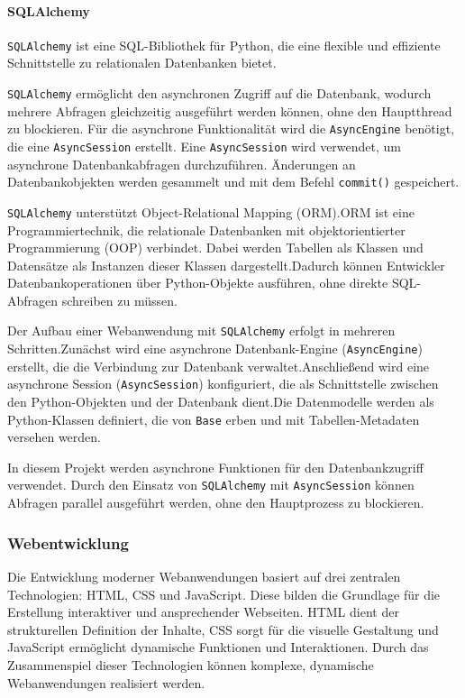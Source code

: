 \documentclass[12pt, letterpaper]{article}
\begin{document}
  \paragraph{SQLAlchemy}
  \par \textbf{}
  \par \texttt{SQLAlchemy} \cite{sqlalchemy} ist eine SQL-Bibliothek für Python, die eine flexible und effiziente Schnittstelle zu relationalen Datenbanken bietet.
  \par \texttt{SQLAlchemy} ermöglicht den asynchronen Zugriff auf die Datenbank, wodurch mehrere Abfragen gleichzeitig ausgeführt werden können, ohne den Hauptthread zu blockieren. Für die asynchrone Funktionalität wird die \texttt{AsyncEngine} benötigt, die eine \texttt{AsyncSession} erstellt. Eine \texttt{AsyncSession} wird verwendet, um asynchrone Datenbankabfragen durchzuführen. Änderungen an Datenbankobjekten werden gesammelt und mit dem Befehl \texttt{commit()} gespeichert.
  \par \texttt{SQLAlchemy} unterstützt Object-Relational Mapping (ORM).ORM ist eine Programmiertechnik, die relationale Datenbanken mit objektorientierter Programmierung (OOP) verbindet. Dabei werden Tabellen als Klassen und Datensätze als Instanzen dieser Klassen dargestellt.Dadurch können Entwickler Datenbankoperationen über Python-Objekte ausführen, ohne direkte SQL-Abfragen schreiben zu müssen.
  \par Der Aufbau einer Webanwendung mit \texttt{SQLAlchemy} erfolgt in mehreren Schritten.Zunächst wird eine asynchrone Datenbank-Engine (\texttt{AsyncEngine}) erstellt, die die Verbindung zur Datenbank verwaltet.Anschließend wird eine asynchrone Session (\texttt{AsyncSession}) konfiguriert, die als Schnittstelle zwischen den Python-Objekten und der Datenbank dient.Die Datenmodelle werden als Python-Klassen definiert, die von \texttt{Base} erben und mit Tabellen-Metadaten versehen werden.
  \par In diesem Projekt werden asynchrone Funktionen für den Datenbankzugriff verwendet. Durch den Einsatz von \texttt{SQLAlchemy} mit \texttt{AsyncSession} können Abfragen parallel ausgeführt werden, ohne den Hauptprozess zu blockieren.

  \subsubsection{Webentwicklung}
  \par Die Entwicklung moderner Webanwendungen basiert auf drei zentralen Technologien: HTML, CSS und JavaScript. Diese bilden die Grundlage für die Erstellung interaktiver und ansprechender Webseiten. HTML dient der strukturellen Definition der Inhalte, CSS sorgt für die visuelle Gestaltung und JavaScript ermöglicht dynamische Funktionen und Interaktionen. Durch das Zusammenspiel dieser Technologien können komplexe, dynamische Webanwendungen realisiert werden.
  
\end{document}
